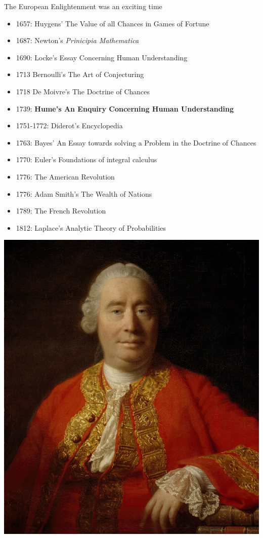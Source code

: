 \documentclass[8pt]{beamer}\usepackage[]{graphicx}\usepackage[]{color}
\begin{document}

\begin{frame}{The European Enlightenment was an exciting time}

%
\begin{minipage}{0.6 \textwidth}
%
{\footnotesize
\begin{itemize}
%
\item 1657: Huygens' The Value of all Chances in Games of Fortune
\item 1687: Newton's {\em Prinicipia Mathematica}
\item 1690: Locke's Essay Concerning Human Understanding
\item 1713 Bernoulli's The Art of Conjecturing
\item 1718 De Moivre's The Doctrine of Chances
\item 1739: \textbf{Hume's An Enquiry Concerning Human Understanding}
\item 1751-1772: Diderot's Encyclopedia
\item 1763: Bayes' An Essay towards solving a Problem in the Doctrine of Chances
\item 1770: Euler's Foundations of integral calculus
\item 1776: The American Revolution
\item 1776: Adam Smith's The Wealth of Nations
\item 1789: The French Revolution
\item 1812: Laplace's Analytic Theory of Probabilities
\vspace{1em}
%
\end{itemize}
}
%
\end{minipage}
\begin{minipage}{0.35 \textwidth}
\includegraphics[width=0.9 \textwidth]{Hume.png}

\end{minipage}
\end{frame}
\end{document}
